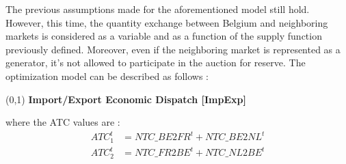 The previous assumptions made for the aforementioned model still hold. However, this time, the quantity exchange between Belgium and neighboring markets is considered as a variable and as a function of the supply function previously defined. Moreover, even if the neighboring market is represented as a generator, it's not allowed to participate in the auction for reserve. The optimization model can be described as follows : \\

\begin{center}
\boxput*(0,1){\colorbox{white}{\textbf{ Import/Export Economic Dispatch [ImpExp] }}}{
\setlength{\fboxsep}{10pt}
}
\end{center}

where the ATC values are :
\begin{align*}
ATC_1^{t} &= NTC\_BE2FR^{t} + NTC\_BE2NL^{t} \\
ATC_2^{t} &= NTC\_FR2BE^{t} + NTC\_NL2BE^{t} 
\end{align*}